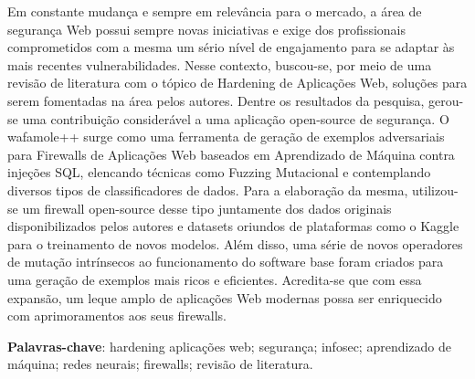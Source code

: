 \begin{resumo}
\begin{SingleSpace}
Em constante mudança e sempre em relevância para o mercado, a área de segurança Web possui sempre novas iniciativas e exige dos profissionais comprometidos com a mesma um sério nível de engajamento para se adaptar às mais recentes vulnerabilidades. Nesse contexto, buscou-se, por meio de uma revisão de literatura com o tópico de Hardening de Aplicações Web, soluções para serem fomentadas na área pelos autores. Dentre os resultados da pesquisa, gerou-se uma contribuição considerável a uma aplicação open-source de segurança. O wafamole++ surge como uma ferramenta de geração de exemplos adversariais para Firewalls de Aplicações Web baseados em Aprendizado de Máquina contra injeções SQL, elencando técnicas como Fuzzing Mutacional e contemplando diversos tipos de classificadores de dados. Para a elaboração da mesma, utilizou-se um firewall open-source desse tipo juntamente dos dados originais disponibilizados pelos autores e datasets oriundos de plataformas como o Kaggle para o treinamento de novos modelos. Além disso, uma série de novos operadores de mutação intrínsecos ao funcionamento do software base foram criados para uma geração de exemplos mais ricos e eficientes. Acredita-se que com essa expansão, um leque amplo de aplicações Web modernas possa ser enriquecido com aprimoramentos aos seus firewalls.
\end{SingleSpace}
\vspace{\onelineskip}
\textbf{Palavras-chave}: hardening aplicações web; segurança; infosec; aprendizado de máquina; redes neurais; firewalls; revisão de literatura.

\end{resumo}



